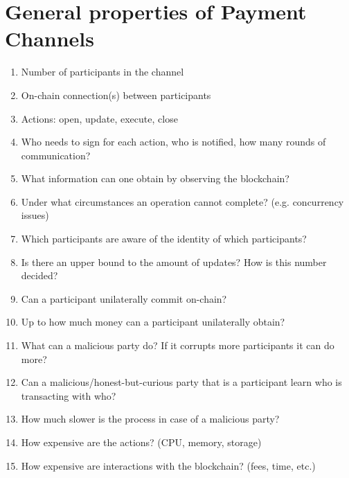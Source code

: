 \section{General properties of Payment Channels}
  \begin{enumerate}
    \item Number of participants in the channel
    \item On-chain connection(s) between participants
    \item Actions: open, update, execute, close
    \item Who needs to sign for each action, who is notified, how many rounds of
    communication?
    \item What information can one obtain by observing the blockchain?
    \item Under what circumstances an operation cannot complete? (e.g. concurrency issues)
    \item Which participants are aware of the identity of which participants?
    \item Is there an upper bound to the amount of updates? How is this number decided?
    \item Can a participant unilaterally commit on-chain?
    \item Up to how much money can a participant unilaterally obtain?
    \item What can a malicious party do? If it corrupts more participants it can do more?
    \item Can a malicious/honest-but-curious party that is a participant learn who is
    transacting with who?
    \item How much slower is the process in case of a malicious party?
    \item How expensive are the actions? (CPU, memory, storage)
    \item How expensive are interactions with the blockchain? (fees, time, etc.)
  \end{enumerate}
